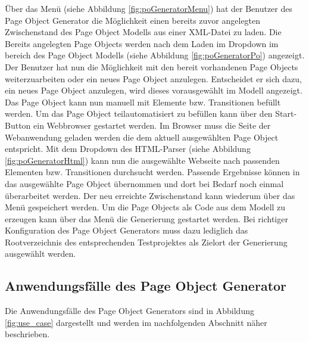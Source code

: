 Über das Menü (siehe Abbildung \ref{fig:poGeneratorMenu}) hat der Benutzer des Page Object Generator die Möglichkeit einen bereits zuvor angelegten Zwischenstand des Page Object Modells aus einer XML-Datei zu laden. Die Bereits angelegten Page Objects werden nach dem Laden im Dropdown im bereich des Page Object Modells (siehe Abbildung \ref{fig:poGeneratorPo}) angezeigt. Der Benutzer hat nun die Möglichkeit mit den bereit vorhandenen Page Objects weiterzuarbeiten oder ein neues Page Object anzulegen. Entscheidet er sich dazu, ein neues Page Object anzulegen, wird dieses vorausgewählt im Modell angezeigt. Das Page Object kann nun manuell mit Elemente bzw. Transitionen befüllt werden. Um das Page Object teilautomatisiert zu befüllen kann über den Start-Button ein Webbrowser gestartet werden. Im Browser muss die Seite der Webanwendung geladen werden die dem aktuell ausgewählten Page Object entspricht. Mit dem Dropdown des HTML-Parser (siehe Abbildung \ref{fig:poGeneratorHtml}) kann nun die ausgewählte Webseite nach passenden Elementen bzw. Transitionen durchsucht werden.
Passende Ergebnisse können in das ausgewählte Page Object übernommen und dort bei Bedarf noch einmal überarbeitet werden.
Der neu erreichte Zwischenstand kann wiederum über das Menü gespeichert werden.
Um die Page Objects als Code aus dem Modell zu erzeugen kann über das Menü die Generierung gestartet werden. Bei richtiger Konfiguration des Page Object Generators muss dazu lediglich das Rootverzeichnis des entsprechenden Testprojektes als Zielort der Generierung ausgewählt werden.


\subsection{Anwendungsfälle des Page Object Generator}
\label{sec:page_object_generator_usecases}

Die Anwendungsfälle des Page Object Generators sind in Abbildung \ref{fig:use_case} dargestellt und werden im nachfolgenden Abschnitt näher beschrieben. 

